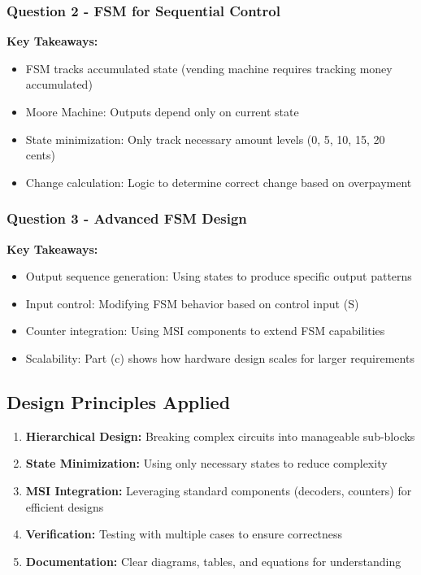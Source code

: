 \documentclass[12pt,a4paper]{article}
\begin{document}
\subsubsection{Question 2 - FSM for Sequential Control}
\begin{tcolorbox}[colback=blue!5!white,colframe=blue!75!black]
\textbf{Key Takeaways:}
\begin{itemize}
  \item FSM tracks accumulated state (vending machine requires tracking money accumulated)
  \item Moore Machine: Outputs depend only on current state
  \item State minimization: Only track necessary amount levels (0, 5, 10, 15, 20 cents)
  \item Change calculation: Logic to determine correct change based on overpayment
\end{itemize}
\end{tcolorbox}

\subsubsection{Question 3 - Advanced FSM Design}
\begin{tcolorbox}[colback=orange!5!white,colframe=orange!75!black]
\textbf{Key Takeaways:}
\begin{itemize}
  \item Output sequence generation: Using states to produce specific output patterns
  \item Input control: Modifying FSM behavior based on control input (S)
  \item Counter integration: Using MSI components to extend FSM capabilities
  \item Scalability: Part (c) shows how hardware design scales for larger requirements
\end{itemize}
\end{tcolorbox}

\subsection{Design Principles Applied}

\begin{enumerate}
  \item \textbf{Hierarchical Design:} Breaking complex circuits into manageable sub-blocks
  \item \textbf{State Minimization:} Using only necessary states to reduce complexity
  \item \textbf{MSI Integration:} Leveraging standard components (decoders, counters) for efficient designs
  \item \textbf{Verification:} Testing with multiple cases to ensure correctness
  \item \textbf{Documentation:} Clear diagrams, tables, and equations for understanding
\end{enumerate}
\end{document}

